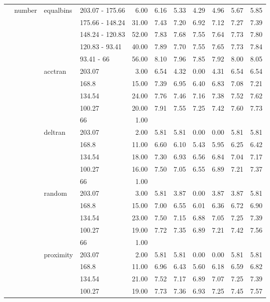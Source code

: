 \begin{longtable}{llllrrrrrrr}
   & number & equalbins & 203.07 - 175.66 & 6.00 & 6.16 & 5.33 & 4.29 & 4.96 & 5.67 & 5.85 \\ 
   &  &  & 175.66 - 148.24 & 31.00 & 7.43 & 7.20 & 6.92 & 7.12 & 7.27 & 7.39 \\ 
   &  &  & 148.24 - 120.83 & 52.00 & 7.83 & 7.68 & 7.55 & 7.64 & 7.73 & 7.80 \\ 
   &  &  & 120.83 - 93.41 & 40.00 & 7.89 & 7.70 & 7.55 & 7.65 & 7.73 & 7.84 \\ 
   &  &  & 93.41 - 66 & 56.00 & 8.10 & 7.96 & 7.85 & 7.92 & 8.00 & 8.05 \\ 
   &  & acctran & 203.07 & 3.00 & 6.54 & 4.32 & 0.00 & 4.31 & 6.54 & 6.54 \\ 
   &  &  & 168.8 & 15.00 & 7.39 & 6.95 & 6.40 & 6.83 & 7.08 & 7.21 \\ 
   &  &  & 134.54 & 24.00 & 7.76 & 7.46 & 7.16 & 7.38 & 7.52 & 7.62 \\ 
   &  &  & 100.27 & 20.00 & 7.91 & 7.55 & 7.25 & 7.42 & 7.60 & 7.73 \\ 
   &  &  & 66 & 1.00 &  &  &  &  &  &  \\ 
   &  & deltran & 203.07 & 2.00 & 5.81 & 5.81 & 0.00 & 0.00 & 5.81 & 5.81 \\ 
   &  &  & 168.8 & 11.00 & 6.60 & 6.10 & 5.43 & 5.95 & 6.25 & 6.42 \\ 
   &  &  & 134.54 & 18.00 & 7.30 & 6.93 & 6.56 & 6.84 & 7.04 & 7.17 \\ 
   &  &  & 100.27 & 16.00 & 7.50 & 7.05 & 6.55 & 6.89 & 7.21 & 7.37 \\ 
   &  &  & 66 & 1.00 &  &  &  &  &  &  \\ 
   &  & random & 203.07 & 3.00 & 5.81 & 3.87 & 0.00 & 3.87 & 3.87 & 5.81 \\ 
   &  &  & 168.8 & 15.00 & 7.00 & 6.55 & 6.01 & 6.36 & 6.72 & 6.90 \\ 
   &  &  & 134.54 & 23.00 & 7.50 & 7.15 & 6.88 & 7.05 & 7.25 & 7.39 \\ 
   &  &  & 100.27 & 19.00 & 7.72 & 7.35 & 6.89 & 7.21 & 7.42 & 7.56 \\ 
   &  &  & 66 & 1.00 &  &  &  &  &  &  \\ 
   &  & proximity & 203.07 & 2.00 & 5.81 & 5.81 & 0.00 & 0.00 & 5.81 & 5.81 \\ 
   &  &  & 168.8 & 11.00 & 6.96 & 6.43 & 5.60 & 6.18 & 6.59 & 6.82 \\ 
   &  &  & 134.54 & 21.00 & 7.52 & 7.17 & 6.89 & 7.07 & 7.25 & 7.39 \\ 
   &  &  & 100.27 & 19.00 & 7.73 & 7.36 & 6.93 & 7.25 & 7.45 & 7.57 \\ 

\end{longtable}
